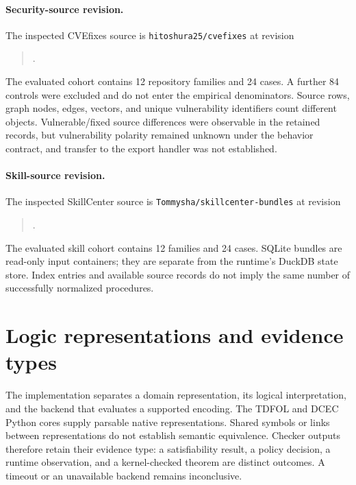 \paragraph{Security-source revision.}
The inspected CVEfixes source is \texttt{hitoshura25/cvefixes} at revision
\begin{quote}\small{}.\end{quote}
The evaluated cohort contains 12 repository families and 24 cases. A further 84 controls were excluded and do not enter the empirical denominators. Source rows, graph nodes, edges, vectors, and unique vulnerability identifiers count different objects. Vulnerable/fixed source differences were observable in the retained records, but vulnerability polarity remained unknown under the behavior contract, and transfer to the export handler was not established.

\paragraph{Skill-source revision.}
The inspected SkillCenter source is \texttt{Tommysha/skillcenter-bundles} at revision
\begin{quote}\small{}.\end{quote}
The evaluated skill cohort contains 12 families and 24 cases. SQLite bundles are read-only input containers; they are separate from the runtime's DuckDB state store. Index entries and available source records do not imply the same number of successfully normalized procedures.

\section{Logic representations and evidence types}
\label{app:logic}
\setcounter{table}{0}

The implementation separates a domain representation, its logical interpretation, and the backend that evaluates a supported encoding. The TDFOL and DCEC Python cores supply parsable native representations. Shared symbols or links between representations do not establish semantic equivalence. Checker outputs therefore retain their evidence type: a satisfiability result, a policy decision, a runtime observation, and a kernel-checked theorem are distinct outcomes. A timeout or an unavailable backend remains inconclusive.

